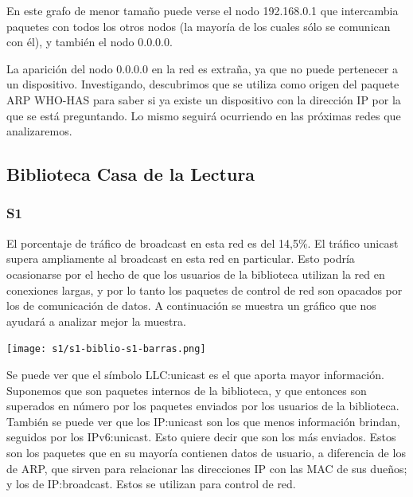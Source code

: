 En este grafo de menor tamaño puede verse el nodo 192.168.0.1 que
intercambia paquetes con todos los otros nodos (la mayoría de los
cuales sólo se comunican con él), y también el nodo 0.0.0.0.

La aparición del nodo 0.0.0.0 en la red es extraña, ya que no
puede pertenecer a un dispositivo. Investigando, descubrimos
que se utiliza como origen del paquete ARP WHO-HAS para saber si
ya existe un dispositivo con la dirección IP por la que se 
está preguntando. Lo mismo seguirá ocurriendo en las próximas
redes que analizaremos.

\subsection{Biblioteca Casa de la Lectura}
\subsubsection{S1}

El porcentaje de tráfico de broadcast en esta red es del 14,5\%. El tráfico unicast supera ampliamente
al broadcast en esta red en particular. Esto podría ocasionarse por el hecho de que los
usuarios de la biblioteca utilizan la red en conexiones largas, y por lo tanto los paquetes
de control de red son opacados por los de comunicación de datos. A continuación se muestra un
gráfico que nos ayudará a analizar mejor la muestra.

\begin{center}
\texttt{[image: s1/s1-biblio-s1-barras.png]}
\end{center}



Se puede ver que el símbolo LLC:unicast es el que aporta mayor información.
Suponemos que son paquetes internos de la biblioteca, y que entonces son
superados en número por los paquetes enviados por los usuarios de la biblioteca.
También se puede ver que los IP:unicast son los que menos información brindan,
seguidos por los IPv6:unicast. Esto quiere decir que son los más enviados.
Estos son los paquetes que en su mayoría contienen datos de usuario,
a diferencia de los de ARP, que sirven para relacionar las direcciones IP con
las MAC de sus dueños; y los de IP:broadcast. Estos se utilizan para control de red.


